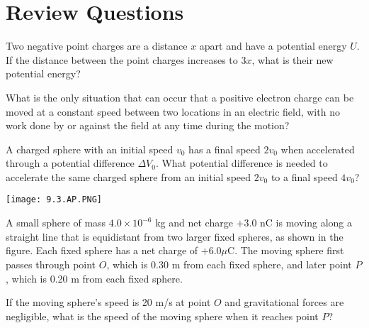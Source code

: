 \documentclass[../em.tex]{subfiles}
\begin{document}
\section*{Review Questions}
\ex Two negative point charges are a distance $x$ apart and have a potential energy $U$. If the distance between the point charges increases to $3x$, what is their new potential energy?

\ex What is the only situation that can occur that a positive electron charge can be moved at a constant speed between two locations in an electric field, with no work done by or against the field at any time during the motion?

\ex A charged sphere with an initial speed $v_0$ has a final speed $2v_0$ when accelerated through a potential difference $\Delta V_0$. What potential difference is needed to accelerate the same charged sphere from an initial speed $2v_0$ to a final speed $4v_0$?

\ex \begin{center}
    \texttt{[image: 9.3.AP.PNG]}
\end{center}
A small sphere of mass $4.0\times 10^{-6}$ kg and net charge $+3.0$ nC is moving along a straight line that is equidistant from two larger fixed spheres, as shown in the figure. Each fixed sphere has a net charge of $+6.0\mu$C. The moving sphere first passes through point $O$, which is $0.30$ m from each fixed sphere, and later point $P$, which is 0.20 m from each fixed sphere.

If the moving sphere's speed is 20 m/s at point $O$ and gravitational forces are negligible, what is the speed of the moving sphere when it reaches point $P$?
\end{document}
